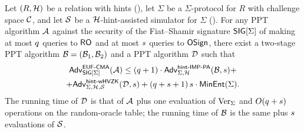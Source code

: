 \begin{lemma}\label{lem:fs-hints}
    Let $(R, \mathcal{H})$ be a relation with hints (), let $\Sigma$ be a $\Sigma$-protocol for $R$ with challenge space $\mathcal{C}$, and let $\operatorname{\mathcal{S}}$ be a $\mathcal{H}$-hint-assisted simulator for $\Sigma$ ().
    For any PPT algorithm $\mathcal{A}$ against the \EUFCMA security of the Fiat--Shamir signature $\mathsf{SIG}[\Sigma]$ of  making at most $q$ queries to $\mathsf{RO}$ and at most $s$ queries to $\mathsf{OSign}$, there exist a two-stage PPT algorithm $\mathcal{B} = (\mathcal{B}_1, \mathcal{B}_2)$ and a PPT algorithm $\mathcal{D}$ such that
    \begin{multline} 
        \mathsf{Adv}^{\mathsf{EUF}\text{-}\mathsf{CMA}}_{\mathsf{SIG}[\Sigma]}(\mathcal{A}) \leq (q + 1)\cdot \mathsf{Adv}^{\mathsf{hint}\text{-}\mathsf{IMP}\text{-}\mathsf{PA}}_{\Sigma,\mathcal{H}}(\mathcal{B},s) + \\ 
        + \mathsf{Adv}^{\mathsf{hint}\text{-}\mathsf{wHVZK}}_{\Sigma,\mathcal{H}, \operatorname{\mathcal{S}}}(\mathcal{D}, s)  + (q + s + 1)\,s \cdot \mathsf{MinEnt}(\Sigma).
    \end{multline}
    The running time of $\mathcal{D}$ is that of $\mathcal{A}$ plus one evaluation of $\operatorname{Ver}_\Sigma$ and $O(q + s)$ operations on the random-oracle table; 
    the running time of $\mathcal{B}$ is the same plus $s$ evaluations of $\operatorname{\mathcal{S}}$.
\end{lemma}

